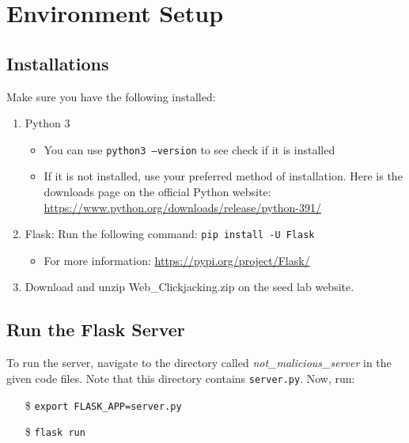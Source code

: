 \section{Environment Setup}


\subsection{Installations}
Make sure you have the following installed:

\begin{enumerate}
    \item Python 3
    \begin{itemize}
        \item You can use \texttt{python3 --version} to see check if it is installed
        \item If it is not installed, use your preferred method of installation. Here is the downloads page on the official Python website: \href{https://www.python.org/downloads/release/python-391/}{https://www.python.org/downloads/release/python-391/}
    \end{itemize}

    \item Flask: Run the following command: \texttt{pip install -U Flask}
    \begin{itemize}
        \item For more information: \href{https://pypi.org/project/Flask/}{https://pypi.org/project/Flask/}
    \end{itemize}
    
    \item Download and unzip Web\_Clickjacking.zip on the seed lab website.
\end{enumerate}



\subsection{Run the Flask Server}
To run the server, navigate to the directory called \textit{not\_malicious\_server} in the given code files. Note that this directory contains \texttt{server.py}. Now, run:
\begin{itemize}
    \item[\$] \texttt{export FLASK\_APP=server.py}
    \item[\$] \texttt{flask run}
\end{itemize}

